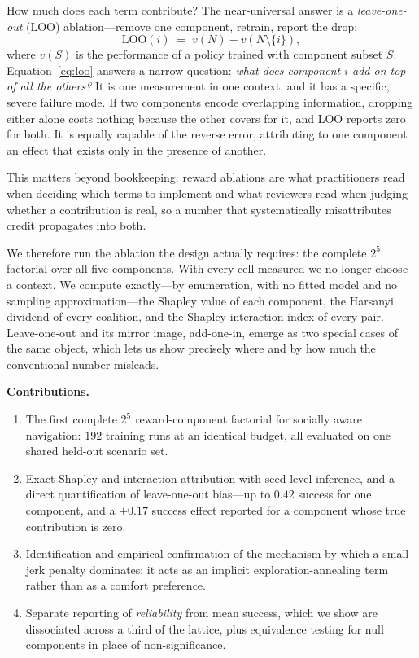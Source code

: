 \documentclass[conference]{IEEEtran}
\begin{document}
How much does each term contribute? The near-universal answer is a
\emph{leave-one-out} (LOO) ablation---remove one component, retrain, report the
drop:
\begin{equation}
\mathrm{LOO}(i) \;=\; v(N) - v(N\setminus\{i\}),
\label{eq:loo}
\end{equation}
where $v(S)$ is the performance of a policy trained with component subset $S$.
Equation~\eqref{eq:loo} answers a narrow question: \emph{what does component $i$
add on top of all the others?} It is one measurement in one context, and it has a
specific, severe failure mode. If two components encode overlapping information,
dropping either alone costs nothing because the other covers for it, and LOO
reports zero for both. It is equally capable of the reverse error, attributing to
one component an effect that exists only in the presence of another.

This matters beyond bookkeeping: reward ablations are what practitioners read when
deciding which terms to implement and what reviewers read when judging whether a
contribution is real, so a number that systematically misattributes credit
propagates into both.

We therefore run the ablation the design actually requires: the complete $2^5$
factorial over all five components. With every cell measured we no longer choose
a context. We compute exactly---by enumeration, with no fitted model and no
sampling approximation---the Shapley value \cite{shapley1953value} of each
component, the Harsanyi dividend \cite{harsanyi1963simplified} of every
coalition, and the Shapley interaction index \cite{grabisch1999axiomatic} of
every pair. Leave-one-out and its mirror image, add-one-in, emerge as two special
cases of the same object, which lets us show precisely where and by how much the
conventional number misleads.

\noindent\textbf{Contributions.}
\begin{enumerate}
\item The first complete $2^5$ reward-component factorial for socially aware
navigation: $192$ training runs at an identical budget, all evaluated on one
shared held-out scenario set.
\item Exact Shapley and interaction attribution with seed-level inference, and a
direct quantification of leave-one-out bias---up to $0.42$ success for one
component, and a $+0.17$ success effect reported for a component whose true
contribution is zero.
\item Identification and empirical confirmation of the mechanism by which a small
jerk penalty dominates: it acts as an implicit exploration-annealing term rather
than as a comfort preference.
\item Separate reporting of \emph{reliability} from mean success, which we show
are dissociated across a third of the lattice, plus equivalence testing for null
components in place of non-significance.
\end{enumerate}
\end{document}
